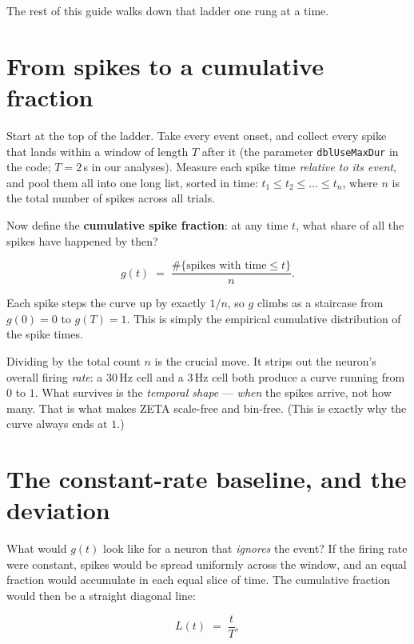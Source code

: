 \documentclass[11pt]{article}
\begin{document}
\noindent
The rest of this guide walks down that ladder one rung at a time.

\section{From spikes to a cumulative fraction}

Start at the top of the ladder. Take every event onset, and collect every spike
that lands within a window of length $T$ after it (the parameter
\texttt{dblUseMaxDur} in the code; $T=2$\,s in our analyses). Measure each spike
time \emph{relative to its event}, and pool them all into one long list,
sorted in time: $t_1 \le t_2 \le \dots \le t_n$, where $n$ is the total number
of spikes across all trials.

Now define the \textbf{cumulative spike fraction}: at any time $t$, what share
of all the spikes have happened by then?

\[
  g(t) \;=\; \frac{\#\{\text{spikes with time} \le t\}}{n}.
\]

Each spike steps the curve up by exactly $1/n$, so $g$ climbs as a staircase
from $g(0)=0$ to $g(T)=1$. This is simply the empirical cumulative
distribution of the spike times.

\begin{keybox}
Dividing by the total count $n$ is the crucial move. It strips out the neuron's
overall firing \emph{rate}: a $30$\,Hz cell and a $3$\,Hz cell both produce a
curve running from $0$ to $1$. What survives is the \emph{temporal shape} ---
\emph{when} the spikes arrive, not how many. That is what makes ZETA scale-free
and bin-free. (This is exactly why the curve always ends at $1$.)
\end{keybox}

\section{The constant-rate baseline, and the deviation}

What would $g(t)$ look like for a neuron that \emph{ignores} the event? If the
firing rate were constant, spikes would be spread uniformly across the window,
and an equal fraction would accumulate in each equal slice of time. The
cumulative fraction would then be a straight diagonal line:

\[
  L(t) \;=\; \frac{t}{T},
\]
\end{document}
